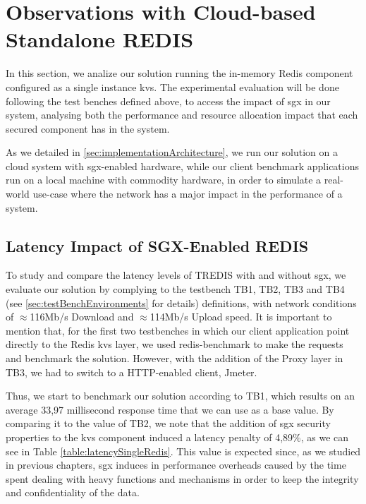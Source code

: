 \section{Observations with Cloud-based Standalone REDIS}
\label{sec:cloudS_Redis}

In this section, we analize our solution running the in-memory Redis component configured as a single instance \gls{kvs}. The experimental evaluation will be done following the test benches defined above, to access the impact of \gls{sgx} in our system, analysing both the performance and resource allocation impact that each secured component has in the system.

As we detailed in \ref{sec:implementationArchitecture}, we run our solution on a cloud system with \gls{sgx}-enabled hardware, while our client benchmark applications run on a local machine with commodity hardware, in order to simulate a real-world use-case where the network has a major impact in the performance of a system.

\subsection{Latency Impact of SGX-Enabled REDIS}

To study and compare the latency levels of TREDIS with and without \gls{sgx}, we evaluate our solution by complying to the testbench TB1, TB2, TB3 and TB4 (see \ref{sec:testBenchEnvironments} for details) definitions, with network conditions of $\approx$116Mb/s Download and $\approx$114Mb/s Upload speed. It is important to mention that, for the first two testbenches in which our client application point directly to the Redis \gls{kvs} layer, we used redis-benchmark to make the requests and benchmark the solution. However, with the addition of the Proxy layer in TB3, we had to switch to a HTTP-enabled client, Jmeter.

Thus, we start to benchmark our solution according to TB1, which results on an average 33,97 millisecond response time that we can use as a base value.
By comparing it to the value of TB2, we note that the addition of \gls{sgx} security properties to the \gls{kvs} component induced a latency penalty of 4,89\%, as we can see in Table \ref{table:latencySingleRedis}. This value is expected since, as we studied in previous chapters, \gls{sgx} induces in performance overheads caused by the time spent dealing with heavy functions and mechanisms in order to keep the integrity and confidentiality of the data.

